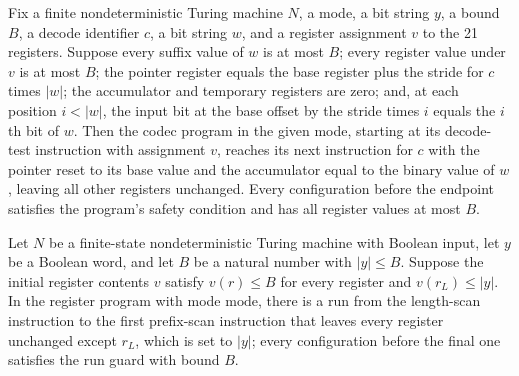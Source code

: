 \begin{theorem}
\label{Complexity.Codec.dc_run}
\leanok
{}
Fix a finite nondeterministic Turing machine $N$, a mode, a bit string $y$, a bound $B$,
a decode identifier $c$, a bit string $w$, and a register assignment $v$ to the 21
registers. Suppose every suffix value of $w$ is at most $B$; every register value under
$v$ is at most $B$; the pointer register equals the base register plus the stride for
$c$ times $|w|$; the accumulator and temporary registers are zero; and, at each position
$i<|w|$, the input bit at the base offset by the stride times $i$ equals the $i$th bit
of $w$. Then the codec program in the given mode, starting at its decode-test
instruction with assignment $v$, reaches its next instruction for $c$ with the pointer
reset to its base value and the accumulator equal to the binary value of $w$, leaving
all other registers unchanged. Every configuration before the endpoint satisfies the
program's safety condition and has all register values at most $B$.
\end{theorem}

\begin{theorem}
\label{Complexity.Codec.len_run}
\leanok
{}
Let $N$ be a finite-state nondeterministic Turing machine with Boolean input, let $y$ be
a Boolean word, and let $B$ be a natural number with $|y|\le B$. Suppose the initial
register contents $v$ satisfy $v(r)\le B$ for every register and $v(r_L)\le |y|$. In the
register program with mode $\mathrm{mode}$, there is a run from the length-scan
instruction to the first prefix-scan instruction that leaves every register unchanged
except $r_L$, which is set to $|y|$; every configuration before the final one satisfies
the run guard with bound $B$.
\end{theorem}

